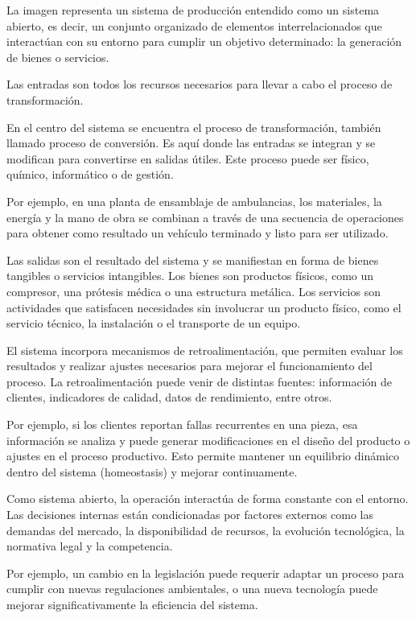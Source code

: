 \documentclass[a4paper,oneside,11pt]{article}
\begin{document}
    La imagen representa un sistema de producción entendido como un sistema abierto, es decir, un conjunto organizado de elementos interrelacionados que interactúan con su entorno para cumplir un objetivo determinado: la generación de bienes o servicios.
    
    Las entradas son todos los recursos necesarios para llevar a cabo el proceso de transformación. 
    
    En el centro del sistema se encuentra el proceso de transformación, también llamado proceso de conversión. Es aquí donde las entradas se integran y se modifican para convertirse en salidas útiles. Este proceso puede ser físico, químico, informático o de gestión.
    
    Por ejemplo, en una planta de ensamblaje de ambulancias, los materiales, la energía y la mano de obra se combinan a través de una secuencia de operaciones para obtener como resultado un vehículo terminado y listo para ser utilizado.
    
    Las salidas son el resultado del sistema y se manifiestan en forma de bienes tangibles o servicios intangibles. Los bienes son productos físicos, como un compresor, una prótesis médica o una estructura metálica. Los servicios son actividades que satisfacen necesidades sin involucrar un producto físico, como el servicio técnico, la instalación o el transporte de un equipo.
    
    El sistema incorpora mecanismos de retroalimentación, que permiten evaluar los resultados y realizar ajustes necesarios para mejorar el funcionamiento del proceso. La retroalimentación puede venir de distintas fuentes: información de clientes, indicadores de calidad, datos de rendimiento, entre otros.
    
    Por ejemplo, si los clientes reportan fallas recurrentes en una pieza, esa información se analiza y puede generar modificaciones en el diseño del producto o ajustes en el proceso productivo. Esto permite mantener un equilibrio dinámico dentro del sistema (homeostasis) y mejorar continuamente.
    
    Como sistema abierto, la operación interactúa de forma constante con el entorno. Las decisiones internas están condicionadas por factores externos como las demandas del mercado, la disponibilidad de recursos, la evolución tecnológica, la normativa legal y la competencia.
    
    Por ejemplo, un cambio en la legislación puede requerir adaptar un proceso para cumplir con nuevas regulaciones ambientales, o una nueva tecnología puede mejorar significativamente la eficiencia del sistema.
\end{document}
